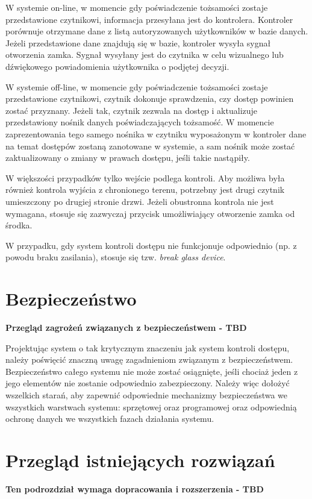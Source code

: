 		W systemie on-line, w momencie gdy poświadczenie tożsamości zostaje przedstawione czytnikowi, informacja przesyłana jest do kontrolera. Kontroler porównuje otrzymane dane z listą autoryzowanych użytkowników w bazie danych. Jeżeli przedstawione dane znajdują się w bazie, kontroler wysyła sygnał otworzenia zamka. Sygnał wysyłany jest do czytnika w celu wizualnego lub dźwiękowego powiadomienia użytkownika o podjętej decyzji.~\cite{bsia2016}

		W systemie off-line, w momencie gdy poświadczenie tożsamości zostaje przedstawione czytnikowi, czytnik dokonuje sprawdzenia, czy dostęp powinien zostać przyznany. Jeżeli tak, czytnik zezwala na dostęp i aktualizuje przedstawiony nośnik danych poświadczających tożsamość. W momencie zaprezentowania tego samego nośnika w czytniku wyposażonym w kontroler dane na temat dostępów zostaną zanotowane w systemie, a sam nośnik może zostać zaktualizowany o zmiany w prawach dostępu, jeśli takie nastąpiły.~\cite{bsia2016}

		W większości przypadków tylko wejście podlega kontroli. Aby możliwa była również kontrola wyjścia z chronionego terenu, potrzebny jest drugi czytnik umieszczony po drugiej stronie drzwi. Jeżeli obustronna kontrola nie jest wymagana, stosuje się zazwyczaj przycisk umożliwiający otworzenie zamka od środka.~\cite{bsia2016}

		W przypadku, gdy system kontroli dostępu nie funkcjonuje odpowiednio (np. z powodu braku zasilania), stosuje się tzw. \textit{break glass device}.~\cite{bsia2016}

	\section{Bezpieczeństwo}
		\textbf{Przegląd zagrożeń związanych z bezpieczeństwem - TBD}

		Projektując system o tak krytycznym znaczeniu jak system kontroli dostępu, należy poświęcić znaczną uwagę zagadnieniom związanym z bezpieczeństwem. Bezpieczeństwo całego systemu nie może zostać osiągnięte, jeśli chociaż jeden z jego elementów nie zostanie odpowiednio zabezpieczony. Należy więc dołożyć wszelkich starań, aby zapewnić odpowiednie mechanizmy bezpieczeństwa we wszystkich warstwach systemu: sprzętowej oraz programowej oraz odpowiednią ochronę danych we wszystkich fazach działania systemu.

	\section{Przegląd istniejących rozwiązań}
		\textbf{Ten podrozdział wymaga dopracowania i rozszerzenia - TBD}

